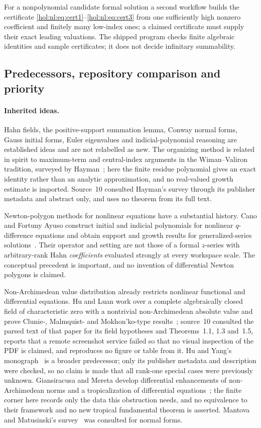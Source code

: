 \documentclass[11pt]{article}
\numberwithin{equation}{section}
\theoremstyle{definition}
\theoremstyle{remark}
\begin{document}
For a nonpolynomial candidate formal solution a second workflow builds the
certificate \eqref{hol:nl:eq:cert1}--\eqref{hol:nl:eq:cert3} from one
sufficiently high nonzero coefficient and finitely many low-index ones; a
claimed certificate must supply their exact leading valuations. The shipped
program checks finite algebraic identities and sample certificates; it does
not decide infinitary summability.

\subsection{Predecessors, repository comparison and priority}
\label{hol:nl:sub:predecessors}

\paragraph{Inherited ideas.}
Hahn fields, the positive-support summation lemma, Conway normal forms, Gauss
initial forms, Euler eigenvalues and indicial-polynomial reasoning are
established ideas and are not relabelled as new. The organizing method is
related in spirit to maximum-term and central-index arguments in the
Wiman--Valiron tradition, surveyed by Hayman~\cite{hayman}; here the finite
residue polynomial gives an exact identity rather than an analytic
approximation, and no real-valued growth estimate is imported. Source~10
consulted Hayman's survey through its publisher metadata and abstract only,
and uses no theorem from its full text.

Newton-polygon methods for nonlinear equations have a substantial history.
Cano and Fortuny Ayuso construct initial and indicial polynomials for
nonlinear $q$-difference equations and obtain support and growth results for
generalized-series solutions~\cite{cano}. Their operator and setting are not
those of a formal $z$-series with arbitrary-rank Hahn \emph{coefficients}
evaluated strongly at every workspace scale. The conceptual precedent is
important, and no invention of differential Newton polygons is claimed.

Non-Archimedean value distribution already restricts nonlinear functional
and differential equations. Hu and Luan work over a complete algebraically
closed field of characteristic zero with a nontrivial non-Archimedean absolute value and prove
Clunie-, Malmquist- and Mokhon'ko-type results~\cite{huluan}; source~10
consulted the parsed text of that paper for its field hypotheses and
Theorems~1.1, 1.3 and~1.5, reports that a remote screenshot service failed so
that no visual inspection of the PDF is claimed, and reproduces no figure or
table from it. Hu and Yang's monograph~\cite{huyang} is a broader
predecessor; only its publisher metadata and description were checked, so no
claim is made that all rank-one special cases were previously unknown.
Giansiracusa and Mereta develop differential enhancements of non-Archimedean
norms and a tropicalization of differential equations~\cite{giansiracusa};
the finite corner here records only the data this obstruction needs, and no
equivalence to their framework and no new tropical fundamental theorem is
asserted. Mantova and Matusinski's survey~\cite{mantovamatusinski} was
consulted for normal forms.
\end{document}
